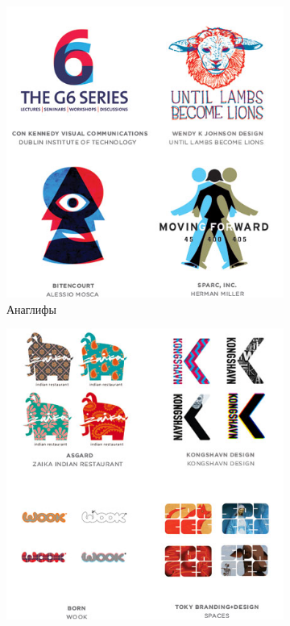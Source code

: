 \begin{figure}[h!]
\begin{subfigure}{.45\textwidth}
    \includegraphics[width=\linewidth]{images/supplement/logolounge/2012/Anaglifi}
    \caption{Анаглифы}
    \label{fig:logolounge:2012:anaglifi}
  \end{subfigure}
  \vfill
  \centering
  \begin{subfigure}{.45\textwidth}
    \centering
    \includegraphics[width=\linewidth]{images/supplement/logolounge/2012/Bratskie-serii.jpeg}

\end{subfigure}
\end{figure}

